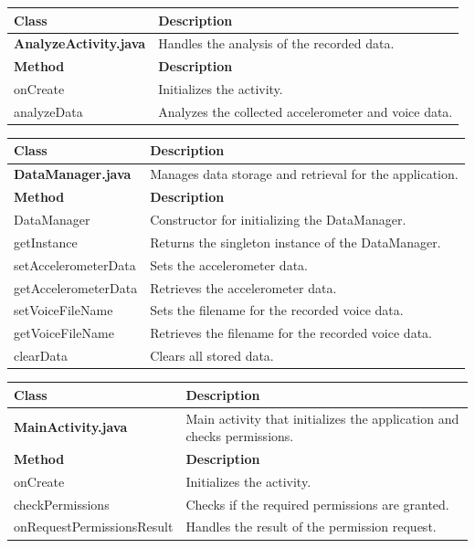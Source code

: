 \documentclass[12pt,a4paper]{article}
\begin{document}
\begin{longtable}{|p{5cm}|p{10cm}|}
\hline
\textbf{Class} & \textbf{Description} \\
\hline
\textbf{AnalyzeActivity.java} & Handles the analysis of the recorded data. \\
\hline
\textbf{Method} & \textbf{Description} \\
\hline
onCreate & Initializes the activity. \\
analyzeData & Analyzes the collected accelerometer and voice data. \\
\hline
\end{longtable}

\begin{longtable}{|p{5cm}|p{10cm}|}
\hline
\textbf{Class} & \textbf{Description} \\
\hline
\textbf{DataManager.java} & Manages data storage and retrieval for the application. \\
\hline
\textbf{Method} & \textbf{Description} \\
\hline
DataManager & Constructor for initializing the DataManager. \\
getInstance & Returns the singleton instance of the DataManager. \\
setAccelerometerData & Sets the accelerometer data. \\
getAccelerometerData & Retrieves the accelerometer data. \\
setVoiceFileName & Sets the filename for the recorded voice data. \\
getVoiceFileName & Retrieves the filename for the recorded voice data. \\
clearData & Clears all stored data. \\
\hline
\end{longtable}

\begin{longtable}{|p{5cm}|p{10cm}|}
\hline
\textbf{Class} & \textbf{Description} \\
\hline
\textbf{MainActivity.java} & Main activity that initializes the application and checks permissions. \\
\hline
\textbf{Method} & \textbf{Description} \\
\hline
onCreate & Initializes the activity. \\
checkPermissions & Checks if the required permissions are granted. \\
onRequestPermissionsResult & Handles the result of the permission request. \\
\hline
\end{longtable}
\end{document}
